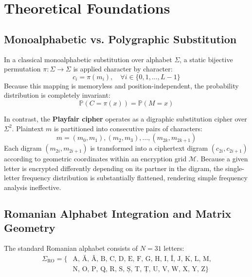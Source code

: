 \documentclass[12pt,a4paper]{article}
\begin{document}
\section{Theoretical Foundations}

\subsection{Monoalphabetic vs. Polygraphic Substitution}
In a classical monoalphabetic substitution over alphabet $\Sigma$, a static bijective permutation $\pi: \Sigma \to \Sigma$ is applied character by character:
\begin{equation}
    c_i = \pi(m_i), \quad \forall i \in \{0, 1, \dots, L-1\}
\end{equation}
Because this mapping is memoryless and position-independent, the probability distribution is completely invariant:
\begin{equation}
    \mathbb{P}(C = \pi(x)) = \mathbb{P}(M = x)
\end{equation}

In contrast, the \textbf{Playfair cipher} operates as a digraphic substitution cipher over $\Sigma^2$. Plaintext $m$ is partitioned into consecutive pairs of characters:
\begin{equation}
    m = (m_0, m_1), (m_2, m_3), \dots, (m_{2k}, m_{2k+1})
\end{equation}
Each digram $(m_{2i}, m_{2i+1})$ is transformed into a ciphertext digram $(c_{2i}, c_{2i+1})$ according to geometric coordinates within an encryption grid $\mathcal{M}$. Because a given letter is encrypted differently depending on its partner in the digram, the single-letter frequency distribution is substantially flattened, rendering simple frequency analysis ineffective.

\subsection{Romanian Alphabet Integration and Matrix Geometry}
The standard Romanian alphabet consists of $N = 31$ letters:
\begin{align*}
    \Sigma_{\text{RO}} = \{ & \text{A, Ă, Â, B, C, D, E, F, G, H, I, Î, J, K, L, M,} \\
                            & \text{N, O, P, Q, R, S, Ș, T, Ț, U, V, W, X, Y, Z} \}
\end{align*}
\end{document}
